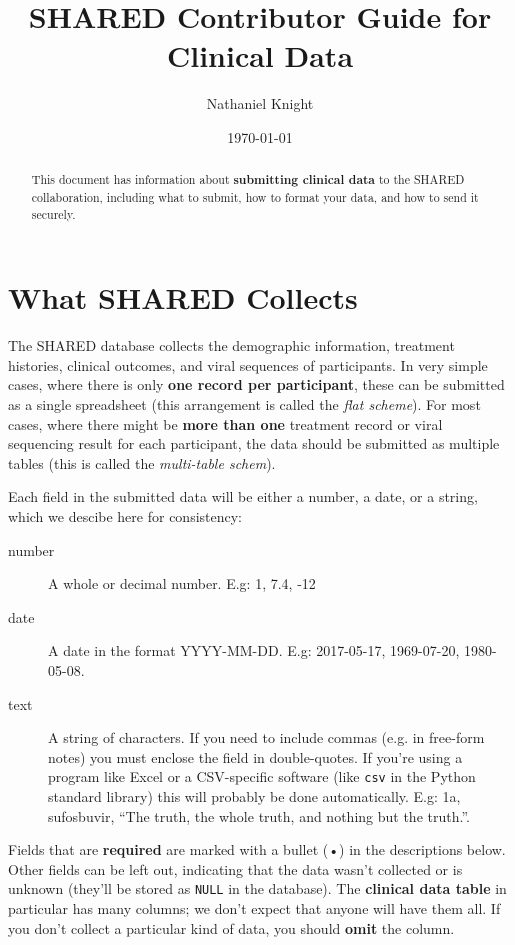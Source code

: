 \documentclass{article}
\author{Nathaniel Knight}
\date{\today}
\title{SHARED Contributor Guide for Clinical Data}
\begin{document}
\maketitle


\begin{abstract}
  This document has information about \textbf{submitting clinical
    data} to the SHARED collaboration, including what to submit, how to
  format your data, and how to send it securely.
\end{abstract}

\newpage

\section{What SHARED Collects}

The SHARED database collects the demographic information, treatment
histories, clinical outcomes, and viral sequences of participants. In
very simple cases, where there is only \textbf{one record per
  participant}, these can be submitted as a single spreadsheet (this
arrangement is called the \textit{flat scheme}). For most cases, where
there might be \textbf{more than one} treatment record or viral
sequencing result for each participant, the data should be submitted
as multiple tables (this is called the \textit{multi-table schem}).

Each field in the submitted data will be either a number, a date, or a
string, which we descibe here for consistency:

\begin{description}
\item[number] A whole or decimal number. E.g: 1, 7.4, -12
\item[date] A date in the format YYYY-MM-DD. E.g: 2017-05-17,
  1969-07-20, 1980-05-08.
\item[text] A string of characters. If you need to include commas
  (e.g. in free-form notes) you must enclose the field in
  double-quotes. If you're using a program like Excel or a
  CSV-specific software (like \texttt{csv} in the Python standard
  library) this will probably be done automatically. E.g: 1a,
  sufosbuvir, ``The truth, the whole truth, and nothing but the
  truth.''.
\end{description}

Fields that are \textbf{required} are marked with a bullet (•) in the
descriptions below.  Other fields can be left out, indicating that the
data wasn't collected or is unknown (they'll be stored as
\texttt{NULL} in the database). The \textbf{clinical data table} in
particular has many columns; we don't expect that anyone will have
them all. If you don't collect a particular kind of data, you should
\textbf{omit} the column.
\end{document}
